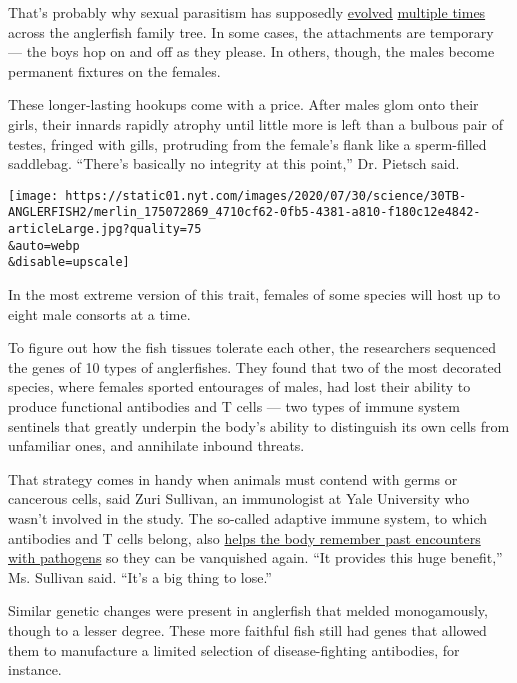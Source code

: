That's probably why sexual parasitism has supposedly
\href{https://pubmed.ncbi.nlm.nih.gov/20178642/}{evolved}
\href{https://bioone.org/journals/copeia/volume-2007/issue-1/0045-8511(2007)7\%5b1\%3aPRODAO\%5d2.0.CO\%3b2/Phylogenetic-Relationships-of-Deep-sea-Anglerfishes-of-the-Suborder-Ceratioidei/10.1643/0045-8511(2007)7\%5B1:PRODAO\%5D2.0.CO;2.short}{multiple
times} across the anglerfish family tree. In some cases, the attachments
are temporary --- the boys hop on and off as they please. In others,
though, the males become permanent fixtures on the females.

These longer-lasting hookups come with a price. After males glom onto
their girls, their innards rapidly atrophy until little more is left
than a bulbous pair of testes, fringed with gills, protruding from the
female's flank like a sperm-filled saddlebag. ``There's basically no
integrity at this point,'' Dr. Pietsch said.

\texttt{[image: https://static01.nyt.com/images/2020/07/30/science/30TB-ANGLERFISH2/merlin\_175072869\_4710cf62-0fb5-4381-a810-f180c12e4842-articleLarge.jpg?quality=75\\\&auto=webp\\\&disable=upscale]}

In the most extreme version of this trait, females of some species will
host up to eight male consorts at a time.

To figure out how the fish tissues tolerate each other, the researchers
sequenced the genes of 10 types of anglerfishes. They found that two of
the most decorated species, where females sported entourages of males,
had lost their ability to produce functional antibodies and T cells ---
two types of immune system sentinels that greatly underpin the body's
ability to distinguish its own cells from unfamiliar ones, and
annihilate inbound threats.

That strategy comes in handy when animals must contend with germs or
cancerous cells, said Zuri Sullivan, an immunologist at Yale University
who wasn't involved in the study. The so-called adaptive immune system,
to which antibodies and T cells belong, also
\href{https://www.nytimes.com/2019/10/31/health/measles-vaccine-immune-system.html}{helps
the body remember past encounters with pathogens} so they can be
vanquished again. ``It provides this huge benefit,'' Ms. Sullivan said.
``It's a big thing to lose.''

Similar genetic changes were present in anglerfish that melded
monogamously, though to a lesser degree. These more faithful fish still
had genes that allowed them to manufacture a limited selection of
disease-fighting antibodies, for instance.

